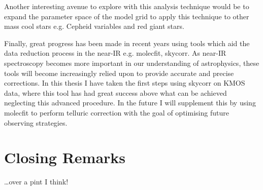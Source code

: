 Another interesting avenue to explore with this analysis technique would be to expand the parameter space of the model grid to apply this technique to other mass cool stars e.g. Cepheid variables and red giant stars.


Finally, great progress has been made in recent years using tools which aid the data reduction process in the near-IR e.g. {\sc molecfit, skycorr}.
As near-IR spectroscopy becomes more important in our understanding of astrophysics, these tools will become increasingly relied upon to provide accurate and precise corrections.
In this thesis I have taken the first steps using {\sc skycorr} on KMOS data, where this tool has had great success above what can be achieved neglecting this advanced procedure.
In the future I will supplement this by using {\sc molecfit} to perform telluric correction with the goal of optimising future observing strategies.


\section{Closing Remarks} %
\label{sec:closing_remarks}

\ldots over a pint I think!

% 
